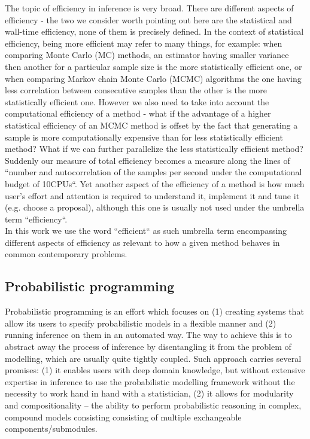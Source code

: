 \documentclass[12pt]{article}
\begin{document}
The topic of efficiency in inference is very broad.
There are different aspects of efficiency - the two we consider worth pointing out here are the statistical and wall-time efficiency,
none of them is precisely defined.
In the context of statistical efficiency, being more efficient may refer to many things, for example: 
when comparing Monte Carlo (MC) methods, an estimator having smaller variance then another for a particular sample size is the more statistically efficient one, or
when comparing Markov chain Monte Carlo (MCMC) algorithms the one having less correlation between consecutive samples than the other is the more statistically efficient one.
However we also need to take into account the computational efficiency of a method - what if the advantage of a higher statistical efficiency of an MCMC method is offset by the fact that generating a sample is more computationally expensive than for less statistically efficient method?
What if we can further parallelize the less statistically efficient method?
Suddenly our measure of total efficiency becomes a measure along the lines of ``number and autocorrelation of the samples per second under the computational budget of 10CPUs``.
Yet another aspect of the efficiency of a method is how much user's effort and attention is required to understand it, implement it and tune it (e.g. choose a proposal), although this one is usually not used under the umbrella term ``efficiency``.\\
In this work we use the word ``efficient`` as such umbrella term encompassing different aspects of efficiency as relevant to how a given method behaves in common contemporary problems.




\subsection{Probabilistic programming}
Probabilistic programming is an effort which focuses on 
(1) creating systems that allow its users to specify probabilistic models in a flexible manner 
and 
(2) running inference on them in an automated way.
The way to achieve this is to abstract away the process of inference by disentangling it from the problem of modelling, which are usually quite tightly coupled.
Such approach carries several promises:
(1) it enables users with deep domain knowledge, but without extensive expertise in inference to use the probabilistic modelling framework without the necessity to work hand in hand with a statistician,
(2) it allows for modularity and compositionality -- the ability to perform probabilistic reasoning in complex, compound models consisting consisting of multiple exchangeable components/submodules.
\end{document}
